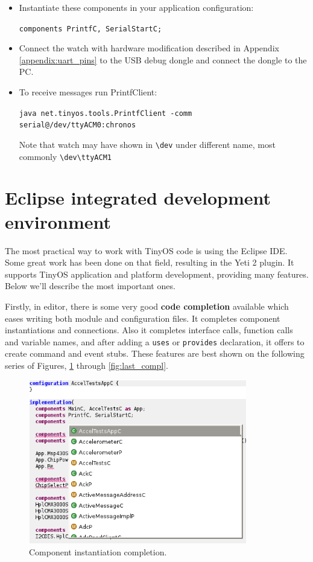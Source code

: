 \begin{itemize}
  \item Instantiate these components in your application configuration:

  \texttt{components PrintfC, SerialStartC;}

  \item Connect the watch with hardware modification described in
    Appendix \ref{appendix:uart_pins} to the USB debug dongle and
    connect the dongle to the PC.

  \item To receive messages run PrintfClient:

  \texttt{java net.tinyos.tools.PrintfClient -comm serial@/dev/ttyACM0:chronos}

  Note that watch may have shown in \texttt{\textbackslash dev} under
  different name, most commonly
  \texttt{\textbackslash dev\textbackslash ttyACM1}
\end{itemize}

\section{Eclipse integrated development environment}

The most practical way to work with TinyOS code is using the Eclipse
IDE. Some great work has been done on that field, resulting in the Yeti 2
plugin. It supports TinyOS application and platform development,
providing many features. Below we'll describe the most important ones.

Firstly, in editor, there is some very good {\bf code completion} available
which eases writing both module and configuration files. It completes
component instantiations and connections. Also it completes interface
calls, function calls and variable names, and after adding a
\texttt{uses} or \texttt{provides} declaration, it offers to create
command and event stubs. These features are best shown on the
following series of Figures, \ref{fig:first_compl} through
\ref{fig:last_compl}.

\begin{figure}[h]
  \centering
  \includegraphics[width=0.85\textwidth]{img/eclipse_compl1.png}
  \caption{Component instantiation completion.}
  \label{fig:first_compl}
\end{figure}

